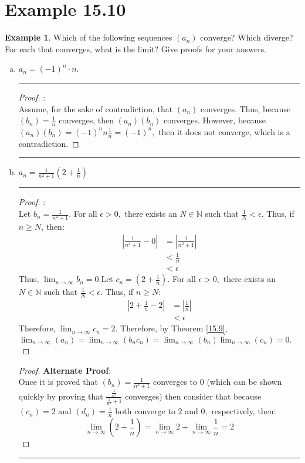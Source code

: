 \documentclass[openany, amssymb, psamsfonts]{amsart}
\newcommand{\bbN}{\mathbb{N}}
\theoremstyle{definition}
\newtheorem{exmp}{Example}[section]
\numberwithin{equation}{section}
\begin{document}
\section*{Example 15.10}
\begin{exmp}\label{15.10}
	Which of the following sequences $(a_n)$ converge?  Which diverge? For each that converges, what is the limit? Give proofs for your answers.
		\begin{enumerate}[(a)]
			\item $a_n = (-1)^n \cdot n$.
\vspace{4pt}     \hrule   \vspace{4pt} \begin{proof}:\\
Assume, for the sake of contradiction, that $(a_n)$ converges. Thus, because $(b_n) = \frac{1}{n}$ converges, then $(a_n)(b_n)$ converges. However, because $(a_n)(b_n) = (-1)^nn\frac{1}{n} = (-1)^n,$ then it does not converge, which is a contradiction.
\end{proof} \vspace{4pt}     \hrule   \vspace{4pt}
			\item $\! a_n = \frac{1}{n^2 + 1}(2+\frac{1}{n})$
\vspace{4pt}     \hrule   \vspace{4pt} \begin{proof}:\\
Let $b_n = \frac{1}{n^2 +1}.$ For all $\epsilon>0,$ there exists an $N\in \bbN$ such that $\frac{1}{N}< \epsilon.$ Thus, if $n\geq N$, then:
\begin{align*}
|\frac{1}{n^2 +1} - 0| &= |\frac{1}{n^2 +1}|\\
&< \frac{1}{n}\\
&< \epsilon
\end{align*}
Thus, $\lim_{n\to \infty}b_n = 0.$\newline Let $c_n = (2+ \frac{1}{n}).$ For all $\epsilon>0, $ there exists an $N\in \bbN$ such that $\frac{1}{N}< \epsilon.$ Thus, if $n\geq N:$
\begin{align*}
|2+ \frac{1}{n} - 2|&= |\frac{1}{n}|\\
&< \epsilon
\end{align*}
Therefore, $\lim_{n\to \infty}c_n = 2.$ Therefore, by Theorem \ref{15.9}, $\lim_{n\to\infty}(a_n) = \lim_{n\to\infty}(b_nc_n) = \lim_{n\to\infty}(b_n) \dot \lim_{n\to\infty}(c_n) = 0.$
\end{proof}
\begin{proof} \textbf{Alternate Proof}:\\
Once it is proved that $(b_n) = \frac{1}{n^2+1}$ converges to $0$ (which can be shown quickly by proving that $\frac{\frac{1}{n^2}}{\frac{1}{n^2} + 1}$ converges) then consider that because $(c_n) = 2$ and $(d_n) = \frac{1}{n}$ both converge to $2$ and $0,$ respectively, then: \[\displaystyle\lim_{n\to \infty}(2+\frac{1}{n}) =\lim_{n\to \infty}2 + \lim_{n\to \infty}\frac{1}{n} = 2 \]
\end{proof}\vspace{4pt}     \hrule   \vspace{4pt}


\end{enumerate}
\end{exmp}
\end{document}
